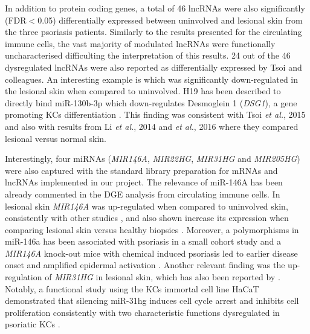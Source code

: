 In addition to protein coding genes, a total of 46 lncRNAs were also significantly (FDR$<$0.05) differentially expressed between uninvolved and lesional skin from the three psoriasis patients. Similarly to the results presented for the circulating immune cells, the vast majority of  modulated lncRNAs were functionally uncharacterised difficulting the interpretation of this results. 24 out of the 46 dysregulated lncRNAs were also reported as differentially expressed by Tsoi and colleagues. An interesting  example is  which was significantly down-regulated in the lesional skin when compared to uninvolved. H19 has been described to directly bind miR-130b-3p which down-regulates Desmoglein 1 (\textit{DSG1}), a gene promoting KCs differentiation \parencite{Li2017}. This finding was consistent with Tsoi \textit{et al.}, 2015 and also with results from Li \textit{et al.}, 2014 and \textit{et al.}, 2016 where they compared lesional versus normal skin. 

Interestingly, four miRNAs (\textit{MIR146A}, \textit{MIR22HG}, \textit{MIR31HG} and \textit{MIR205HG}) were also captured with the standard library preparation for mRNAs and lncRNAs implemented in our project. The relevance of miR-146A has been already commented in the DGE analysis from circulating immune cells. In lesional skin \textit{MIR146A} was up-regulated when compared to uninvolved skin, consistently with other studies \parencite{Lerman2014, Tsoi2015}, and also shown increase its expression when comparing lesional skin versus healthy biopsies \parencite{Li2014}. Moreover, a polymorphisms in miR-146a has been associated with psoriasis in a small cohort study and a \textit{MIR146A} knock-out mice with chemical induced psoriasis led to earlier disease onset and amplified epidermal activation \parencite{Srivastava2017}. Another relevant finding was the up-regulation of \textit{MIR31HG} in lesional skin, which has also been reported by \parencite{Tsoi2015}. Notably, a functional study using the KCs immortal cell line HaCaT demonstrated that silencing miR-31hg induces cell cycle arrest and inhibits cell proliferation consistently with two characteristic functions dysregulated in psoriatic KCs \parencite{Gao2018}.


